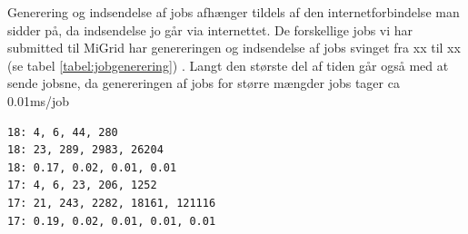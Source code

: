 Generering og indsendelse af jobs afhænger tildels af den internetforbindelse
man sidder på, da indsendelse jo går via internettet. De forskellige jobs vi har
submitted til MiGrid har genereringen og indsendelse af jobs svinget fra xx til
xx (se tabel \ref{tabel:jobgenerering}) . Langt den største del af tiden går også med at sende jobsne,
da genereringen af jobs for større mængder jobs tager ca 0.01ms/job
\begin{verbatim}
18: 4, 6, 44, 280
18: 23, 289, 2983, 26204
18: 0.17, 0.02, 0.01, 0.01
17: 4, 6, 23, 206, 1252
17: 21, 243, 2282, 18161, 121116
17: 0.19, 0.02, 0.01, 0.01, 0.01
\end{verbatim}
